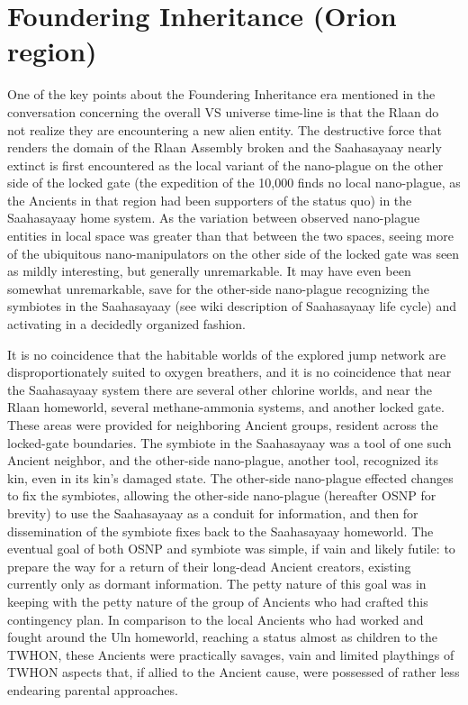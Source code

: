 \section{Foundering Inheritance (Orion region)}
One of the key points about the Foundering Inheritance era mentioned
in the conversation concerning the overall VS universe time-line is
that the Rlaan do not realize they are encountering a new alien
entity. The destructive force that renders the domain of the Rlaan
Assembly broken and the Saahasayaay nearly extinct is first
encountered as the local variant of the nano-plague on the other side
of the locked gate (the expedition of the 10,000 finds no local
nano-plague, as the Ancients in that region had been supporters of the
status quo) in the Saahasayaay home system. As the variation between
observed nano-plague entities in local space was greater than that
between the two spaces, seeing more of the ubiquitous
nano-manipulators on the other side of the locked gate was seen as
mildly interesting, but generally unremarkable. It may have even been
somewhat unremarkable, save for the other-side nano-plague recognizing
the symbiotes in the Saahasayaay (see wiki description of Saahasayaay
life cycle) and activating in a decidedly organized fashion.

It is no coincidence that the habitable worlds of the explored jump
network are disproportionately suited to oxygen breathers, and it is
no coincidence that near the Saahasayaay system there are several
other chlorine worlds, and near the Rlaan homeworld, several
methane-ammonia systems, and another locked gate. These areas were
provided for neighboring Ancient groups, resident across the
locked-gate boundaries. The symbiote in the Saahasayaay was a tool of
one such Ancient neighbor, and the other-side nano-plague, another
tool, recognized its kin, even in its kin's damaged state. The
other-side nano-plague effected changes to fix the symbiotes, allowing
the other-side nano-plague (hereafter OSNP for brevity) to use the
Saahasayaay as a conduit for information, and then for dissemination
of the symbiote fixes back to the Saahasayaay homeworld. The eventual
goal of both OSNP and symbiote was simple, if vain and likely futile:
to prepare the way for a return of their long-dead Ancient creators,
existing currently only as dormant information. The petty nature of
this goal was in keeping with the petty nature of the group of
Ancients who had crafted this contingency plan. In comparison to the
local Ancients who had worked and fought around the Uln homeworld,
reaching a status almost as children to the TWHON, these Ancients were
practically savages, vain and limited playthings of TWHON aspects
that, if allied to the Ancient cause, were possessed of rather less
endearing parental approaches.

